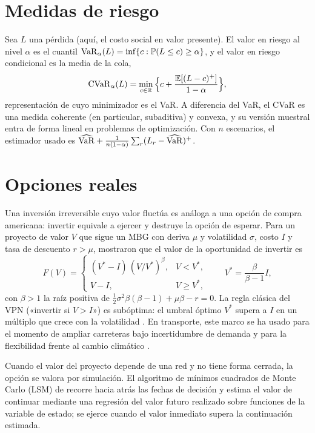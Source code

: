 \section{Medidas de riesgo}

Sea $L$ una pérdida (aquí, el costo social en valor presente). El valor en riesgo al nivel $\alpha$ es
el cuantil $\operatorname{VaR}_\alpha(L)=\inf\{c:\mathbb{P}(L\le c)\ge\alpha\}$, y el valor en riesgo condicional es la
media de la cola,
\begin{equation}\label{eq:cvar}
\operatorname{CVaR}_\alpha(L)=\min_{c\in\mathbb{R}}\Big\{c+\frac{\mathbb{E}[(L-c)^+]}{1-\alpha}\Big\},
\end{equation}
representación de \citet{rockafellar2000} cuyo minimizador es el VaR. A diferencia del VaR, el CVaR es
una medida coherente (en particular, subaditiva) y convexa, y su versión muestral entra de forma lineal
en problemas de optimización. Con $n$ escenarios, el estimador usado es
$\widehat{\operatorname{VaR}}+\frac{1}{n(1-\alpha)}\sum_r(L_r-\widehat{\operatorname{VaR}})^+$.

\section{Opciones reales}

Una inversión irreversible cuyo valor fluctúa es análoga a una opción de compra americana: invertir
equivale a ejercer y destruye la opción de esperar. Para un proyecto de valor $V$ que sigue un MBG con
deriva $\mu$ y volatilidad $\sigma$, costo $I$ y tasa de descuento $r>\mu$, \citet{mcdonald1986}
mostraron que el valor de la oportunidad de invertir es
\begin{equation}\label{eq:ms}
F(V)=\begin{cases}(V^*-I)\,(V/V^*)^{\beta}, & V<V^*,\\ V-I, & V\ge V^*,\end{cases}
\qquad V^*=\frac{\beta}{\beta-1}I,
\end{equation}
con $\beta>1$ la raíz positiva de $\tfrac12\sigma^2\beta(\beta-1)+\mu\beta-r=0$. La regla clásica del
VPN («invertir si $V>I$») es subóptima: el umbral óptimo $V^*$ supera a $I$ en un múltiplo que crece con
la volatilidad \citep{dixit1994}. En transporte, este marco se ha usado para el momento de ampliar
carreteras bajo incertidumbre de demanda \citep{wang2017} y para la flexibilidad frente al cambio
climático \citep{li2022}.

Cuando el valor del proyecto depende de una red y no tiene forma cerrada, la opción se valora por
simulación. El algoritmo de mínimos cuadrados de Monte Carlo (LSM) de \citet{longstaff2001} recorre
hacia atrás las fechas de decisión y estima el valor de continuar mediante una regresión del valor
futuro realizado sobre funciones de la variable de estado; se ejerce cuando el valor inmediato supera
la continuación estimada.

